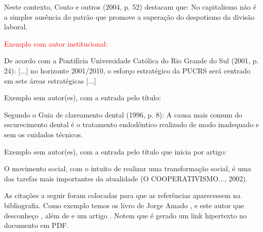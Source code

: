 Neste contexto, Couto e outros (2004, p. 52) destacam que: {\textquotedbl}No capitalismo não é a simples ausência do
patrão que promove a superação do despotismo da divisão laboral.{\textquotedbl}\\

\bigskip

{\sffamily
	\textrm{\textcolor{red}{Exemplo com autor institucional: }}}

\bigskip

De acordo com a Pontifícia Universidade Católica do Rio Grande do Sul (2001, p. 24): {\textquotedbl}[...] no horizonte 2001/2010, o esforço estratégico da PUCRS será centrado em sete áreas estratégicas [...]{\textquotedbl}\\

\bigskip

{\color{red}
	Exemplo sem autor(es), com a entrada pelo título:}

\bigskip

Segundo o Guia de clareamento dental (1996, p. 8): {\textquotedbl}A causa mais comum do escurecimento dental é o tratamento endodôntico realizado de modo inadequado e sem os cuidados técnicos.{\textquotedbl}\\

\bigskip

{\color{red}
	Exemplo sem autor(es), com a entrada pelo título que inicia por artigo:}

\bigskip

O movimento social, com o intuito de realizar uma transformação social, é uma das tarefas mais importantes da atualidade
(O COOPERATIVISMO..., 2002).\\

\bigskip

As citações a seguir foram colocadas para que as referências aparecessem na bibliografia. Como exemplo temos os livro de Jorge Amado \cite{book:AMADO}  \cite{book:AMADO2}, e este autor que desconheço \cite{book:OHANSSON}, além de \cite{book:ENGEL} e um artigo \cite{art:PRADO}. Notem que é gerado um link hipertexto no documento em PDF.
